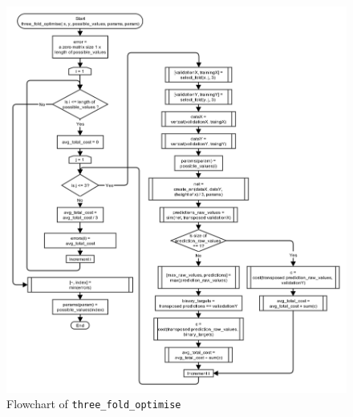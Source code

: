 \documentclass[10pt,a4paper]{article}
\begin{document}
\begin{figure}[!ht]
	\centering
	\includegraphics[height=\textheight, width=\textwidth]{images/flow_chart/three_fold_optimise.png}
	\caption{Flowchart of \tt{three\_fold\_optimise}}
	\label{fig:three_fold_optimise}
\end{figure}
\end{document}
